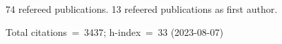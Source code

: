 74 refereed publications. 13 refeered publications as first author.

Total citations~=~3437; h-index~=~33 (2023-08-07)